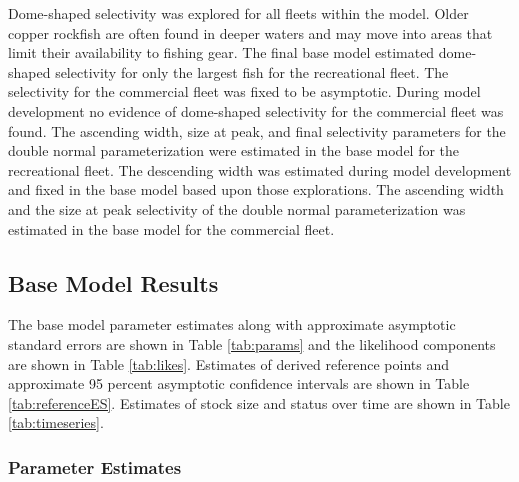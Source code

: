 \documentclass[11pt,
  english,
  a4paper,
]{article}
\begin{document}
\leavevmode\tagmcend\tagstructend\par


Dome-shaped selectivity was explored for all fleets within the model. Older copper rockfish are often found in deeper waters and may move into areas that limit their availability to fishing gear. The final base model estimated dome-shaped selectivity for only the largest fish for the recreational fleet. The selectivity for the commercial fleet was fixed to be asymptotic. During model development no evidence of dome-shaped selectivity for the commercial fleet was found. The ascending width, size at peak, and final selectivity parameters for the double normal parameterization were estimated in the base model for the recreational fleet. The descending width was estimated during model development and fixed in the base model based upon those explorations. The ascending width and the size at peak selectivity of the double normal parameterization was estimated in the base model for the commercial fleet.

\leavevmode\tagmcend\tagstructend\par


\hypertarget{base-model-results}{%
\subsection{Base Model Results}\label{base-model-results}}

\leavevmode\tagmcend\tagstructend


The base model parameter estimates along with approximate asymptotic standard errors are shown in Table \ref{tab:params} and the likelihood components are shown in Table \ref{tab:likes}. Estimates of derived reference points and approximate 95 percent asymptotic confidence intervals are shown in Table \ref{tab:referenceES}. Estimates of stock size and status over time are shown in Table \ref{tab:timeseries}.

\leavevmode\tagmcend\tagstructend\par


\hypertarget{para-estimates}{%
\subsubsection{Parameter Estimates}\label{para-estimates}}
\end{document}
